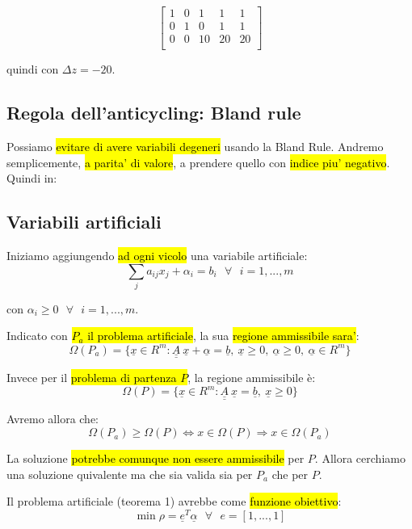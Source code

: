 $$
\left[ {\begin{array}{ccccc}
	1 & 0 & 1 & 1 & 1\\
	0 & 1 & 0 & 1 & 1\\
	0 & 0 & 10 & 20 & 20\\
\end{array} } \right]
$$

quindi con $\Delta z = - 20$.


\subsection{Regola dell'anticycling: Bland rule}

Possiamo \hl{evitare di avere variabili degeneri} usando la Bland Rule. Andremo semplicemente, \hl{a parita' di valore}, a prendere quello con \hl{indice piu' negativo}. Quindi in:


\subsection{Variabili artificiali}

Iniziamo aggiungendo \hl{ad ogni vicolo} una variabile artificiale:
$$\sum_j a_{ij}x_j + \alpha_i = b_i\ \ \ \forall\ \ \ i = 1, ..., m$$

con $\alpha_i \geq 0\ \ \ \forall\ \ \ i = 1, ..., m$.

Indicato con \hl{$P_a$ il problema artificiale}, la sua \hl{regione ammissibile sara'}:
$$\Omega(P_a) = \{\underline{x} \in R^m : \underline{\underline{A}}\ \underline{x} + \underline{\alpha} = \underline{b},\ \underline{x} \geq 0,\ \underline{\alpha} \geq 0,\ \underline{\alpha} \in R^m\}$$

Invece per il \hl{problema di partenza $P$}, la regione ammissibile è:
$$\Omega(P) = \{\underline{x} \in R^m : \underline{\underline{A}}\ \underline{x} = \underline{b},\ \underline{x} \geq 0\}$$

Avremo allora che:
$$\Omega(P_a) \geq \Omega(P) \Leftrightarrow x \in \Omega(P) \Rightarrow x \in \Omega(P_a)$$

La soluzione \hl{potrebbe comunque non essere ammissibile} per $P$. Allora cerchiamo una soluzione quivalente ma che sia valida sia per $P_a$ che per $P$.

Il problema artificiale (teorema 1) avrebbe come \hl{funzione obiettivo}:
$$\min \rho = \underline{e}^T \underline{\alpha}\ \ \ \forall\ \ \ e = [1, ..., 1]$$

